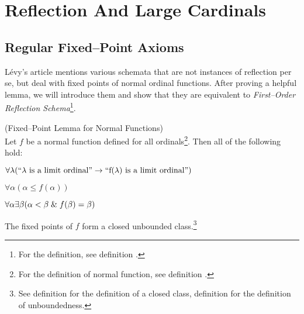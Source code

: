 \section{Reflection And Large Cardinals}

\subsection{Regular Fixed–Point Axioms}\label{sec:regular_fixed_points}
Lévy's article mentions various schemata that are not instances of reflection per se, but deal with fixed points of normal ordinal functions. 
After proving a helpful lemma, we will introduce them and show that they are equivalent to \emph{First–Order Reflection Schema}\footnote{For the definition, see definition .}.

\begin{lemma}{(Fixed–Point Lemma for Normal Functions)}\label{lemma:normal_fixed_point}\\
Let $f$ be a normal function defined for all ordinals\footnote{For the definition of normal function, see definition .}. Then all of the following hold:
\bce[(i)]
\item $\forall \lambda(\mbox{``$\lambda$ is a limit ordinal''} \rightarrow \mbox{``f($\lambda$) is a limit ordinal''})$
\item $\forall \alpha (\alpha \leq f(\alpha))$
\item $\forall \alpha \exists \beta (\alpha < \beta \mathrel{\&} f(\beta) = \beta)$
\item The fixed points of $f$ form a closed unbounded class.\footnote{See definition  for the definition of a closed class, definition  for the definition of unboundedness.}
\ece
\end{lemma}

